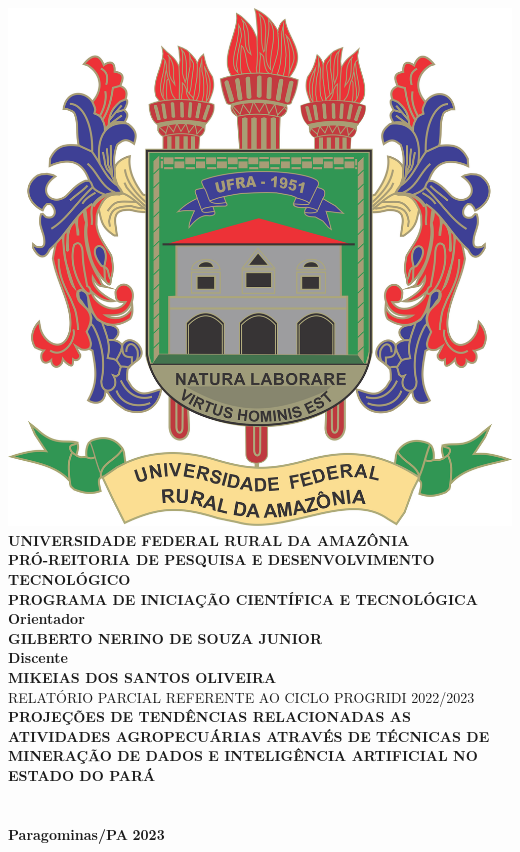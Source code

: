 \thispagestyle{empty}
    \begin{center}
        
        \includegraphics[scale=0.1]{src/Brasão_ufra.png}\\
        \vspace{0.25cm}
        \textbf{UNIVERSIDADE FEDERAL RURAL DA AMAZÔNIA}\\
        \textbf{PRÓ-REITORIA DE PESQUISA E DESENVOLVIMENTO TECNOLÓGICO}\\
        \textbf{PROGRAMA DE INICIAÇÃO CIENTÍFICA E TECNOLÓGICA}\\
        \vspace{2cm}
         \textbf{Orientador \\ GILBERTO NERINO DE SOUZA JUNIOR}\\
        \vspace{0.5cm}
        \textbf{Discente \\ MIKEIAS DOS SANTOS OLIVEIRA}\\
        \vspace{1cm}
        RELATÓRIO PARCIAL REFERENTE AO CICLO PROGRIDI 2022/2023\\
        \vspace{2cm}
        \textbf{PROJEÇÕES DE TENDÊNCIAS RELACIONADAS AS ATIVIDADES AGROPECUÁRIAS ATRAVÉS DE TÉCNICAS DE MINERAÇÃO DE DADOS E INTELIGÊNCIA ARTIFICIAL NO ESTADO DO PARÁ}\\
        \vspace{2cm}
        \\
        \\
        \vspace{2cm}
        \textbf{Paragominas/PA}
        \textbf{2023}\\
        \vspace{1.5cm}
  
    \end{center}
